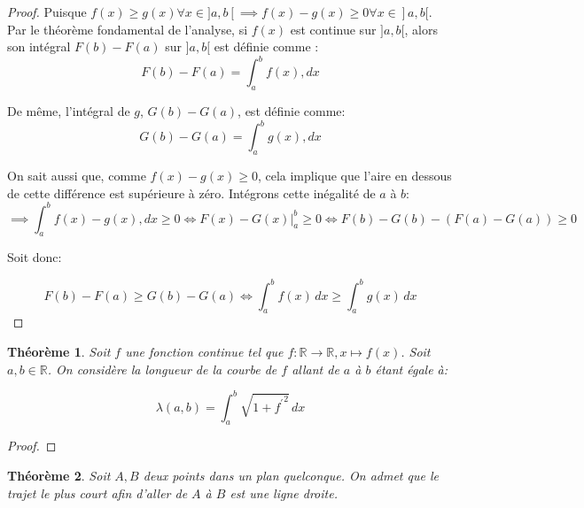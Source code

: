 \documentclass{amsart}
\newtheorem{theorem}{Théorème}[section]
\theoremstyle{definition}
\theoremstyle{remark}
\numberwithin{equation}{section}
\begin{document}
\begin{proof}
  Puisque $f(x)\geq g(x) \forall x\in]a,b[ \implies f(x)-g(x)\geq 0\forall x\in]a,b[ $. Par le théorème fondamental de l’analyse, si $f(x)$ est continue sur $]a,b[$, alors son intégral $F(b)-F(a)$ sur $]a,b[$ est définie comme : 
  \[F(b)-F(a) = \int_{a}^{b} f(x) , dx\]

  De même, l'intégral de $g$, $G(b)-G(a)$, est définie comme: \[G(b)-G(a) = \int_{a}^{b} g(x) , dx\]
  
  On sait aussi que, comme $f(x)-g(x)\geq0$, cela implique que l'aire en dessous de cette différence est supérieure à zéro. Intégrons cette inégalité de $a$ à $b$: \[\implies \int_{a}^{b} f(x) - g(x), dx \geq 0 \Leftrightarrow F(x)-G(x) \Biggr|_{a}^{b}\geq0 \Leftrightarrow F(b)-G(b) -(F(a)-G(a)) \geq 0 \]

  Soit donc:

  \[F(b)-F(a) \geq G(b)-G(a) \Leftrightarrow \int_{a}^{b}f(x) \,dx \geq \int_{a}^{b}g(x) \,dx\]
\end{proof}

\begin{theorem}
  Soit $f$ une fonction continue tel que $f:\mathbb{R}\longrightarrow \mathbb{R}, x\longmapsto f(x)$. Soit $a,b\in\mathbb{R}$. On considère la longueur de la courbe de $f$ allant de $a$ à $b$ étant égale à:
  
  \[\lambda(a,b)=\int_{a}^{b} \sqrt{1+{f^\prime}^2} \,dx\]
\end{theorem}

\begin{proof}
  
\end{proof}

\begin{theorem}
  Soit $A,B$ deux points dans un plan quelconque. On admet que le trajet le plus court afin d'aller de $A$ à $B$ est une ligne droite.
\end{theorem}
\end{document}
